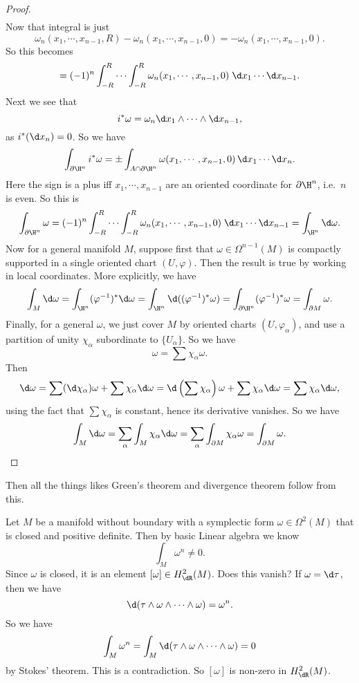 \documentclass[a4paper]{article}
\begin{document}
\begin{proof}
\begin{align*}
  \end{align*}
  Now that integral is just
  \[
    \omega_n(x_1, \cdots, x_{n - 1}, R) - \omega_n(x_1, \cdots, x_{n - 1}, 0) = -\omega_n(x_1, \cdots, x_{n - 1}, 0).
  \]
  So this becomes
  \[
    =(-1)^n \int_{-R}^R \cdots \int_{-R}^R \omega_n(x_1, \cdots, x_{n - 1}, 0)\;\d x_1 \cdots \d x_{n - 1}.
  \]
  Next we see that
  \[
    i^* \omega = \omega_n \d x_1 \wedge \cdots \wedge \d x_{n - 1},
  \]
  as $i^*(\d x_n) = 0$. So we have
  \[
    \int_{\partial \H^n} i^* \omega = \pm \int_{A \cap \partial \H^n} \omega(x_1, \cdots, x_{n - 1}, 0) \, \d x_1 \cdots \d x_n.
  \]
  Here the sign is a plus iff $x_1, \cdots, x_{n - 1}$ are an oriented coordinate for $\partial \H^n$, i.e.\ $n$ is even. So this is
  \[
    \int_{\partial \H^n} \omega = (-1)^n \int_{-R}^R \cdots \int_{-R}^R \omega_n(x_1, \cdots, x_{n - 1}, 0)\;\d x_1 \cdots \d x_{n - 1} = \int_{\H^n} \d \omega.
  \]
  Now for a general manifold $M$, suppose first that $\omega \in \Omega^{n - 1}(M)$ is compactly supported in a single oriented chart $(U, \varphi)$. Then the result is true by working in local coordinates. More explicitly, we have
  \[
    \int_M \d \omega = \int_{\H^n}(\varphi^{-1})^* \d \omega = \int_{\H^n} \d((\varphi^{-1})^* \omega) = \int_{\partial \H^n} (\varphi^{-1})^* \omega = \int_{\partial M} \omega.
  \]
  Finally, for a general $\omega$, we just cover $M$ by oriented charts $(U, \varphi_\alpha)$, and use a partition of unity $\chi_\alpha$ subordinate to $\{U_\alpha\}$. So we have
  \[
    \omega = \sum \chi_\alpha \omega.
  \]
  Then
  \[
    \d \omega = \sum (\d \chi_\alpha) \omega + \sum \chi_\alpha \d \omega = \d\left(\sum \chi_\alpha\right) \omega + \sum \chi_\alpha \d \omega = \sum \chi_\alpha \d \omega,
  \]
  using the fact that $\sum \chi_\alpha$ is constant, hence its derivative vanishes. So we have
  \[
    \int_M \d \omega = \sum_\alpha \int_M \chi_\alpha \d \omega = \sum_\alpha \int_{\partial M} \chi_\alpha \omega = \int_{\partial M}\omega. \qedhere
  \]
\end{proof}
Then all the things likes Green's theorem and divergence theorem follow from this.

\begin{eg}
  Let $M$ be a manifold without boundary with a symplectic form $\omega \in \Omega^2(M)$ that is closed and positive definite. Then by basic Linear algebra we know
  \[
    \int_M \omega^n \not= 0.
  \]
  Since $\omega$ is closed, it is an element $[\omega] \in H_{\dR}^2 (M)$. Does this vanish? If $\omega = \d \tau$, then we have
  \[
    \d (\tau \wedge \omega \wedge \cdots \wedge \omega) = \omega^n.
  \]
  So we have
  \[
    \int_M \omega^n = \int_M \d (\tau \wedge \omega \wedge \cdots \wedge \omega) = 0
  \]
  by Stokes' theorem. This is a contradiction. So $[\omega]$ is non-zero in $H^2_{\dR}(M)$.
\end{eg}
\end{document}
